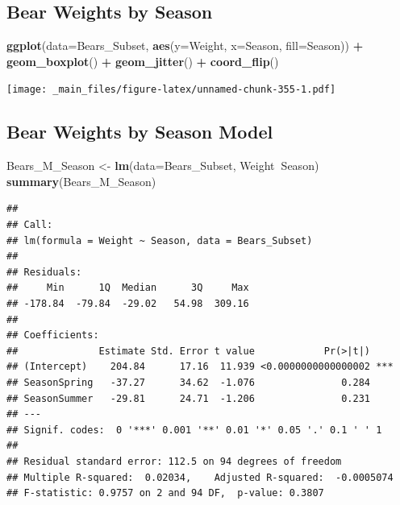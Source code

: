 \documentclass[]{book}
\newenvironment{Shaded}{\begin{snugshade}}{\end{snugshade}}
\newcommand{\KeywordTok}[1]{\textcolor[rgb]{0.13,0.29,0.53}{\textbf{#1}}}
\newcommand{\DataTypeTok}[1]{\textcolor[rgb]{0.13,0.29,0.53}{#1}}
\newcommand{\StringTok}[1]{\textcolor[rgb]{0.31,0.60,0.02}{#1}}
\newcommand{\OperatorTok}[1]{\textcolor[rgb]{0.81,0.36,0.00}{\textbf{#1}}}
\newcommand{\NormalTok}[1]{#1}
\begin{document}
\subsection{Bear Weights by Season}\label{bear-weights-by-season}

\begin{Shaded}
\begin{Highlighting}[]
\KeywordTok{ggplot}\NormalTok{(}\DataTypeTok{data=}\NormalTok{Bears_Subset, }\KeywordTok{aes}\NormalTok{(}\DataTypeTok{y=}\NormalTok{Weight, }\DataTypeTok{x=}\NormalTok{Season, }\DataTypeTok{fill=}\NormalTok{Season)) }\OperatorTok{+}\StringTok{ }
\StringTok{   }\KeywordTok{geom_boxplot}\NormalTok{() }\OperatorTok{+}\StringTok{ }\KeywordTok{geom_jitter}\NormalTok{() }\OperatorTok{+}\StringTok{ }\KeywordTok{coord_flip}\NormalTok{()}
\end{Highlighting}
\end{Shaded}

\texttt{[image: \_main\_files/figure-latex/unnamed-chunk-355-1.pdf]}

\subsection{Bear Weights by Season
Model}\label{bear-weights-by-season-model}

\begin{Shaded}
\begin{Highlighting}[]
\NormalTok{Bears_M_Season <-}\StringTok{ }\KeywordTok{lm}\NormalTok{(}\DataTypeTok{data=}\NormalTok{Bears_Subset, Weight}\OperatorTok{~}\NormalTok{Season)}
\KeywordTok{summary}\NormalTok{(Bears_M_Season)}
\end{Highlighting}
\end{Shaded}

\begin{verbatim}
## 
## Call:
## lm(formula = Weight ~ Season, data = Bears_Subset)
## 
## Residuals:
##     Min      1Q  Median      3Q     Max 
## -178.84  -79.84  -29.02   54.98  309.16 
## 
## Coefficients:
##              Estimate Std. Error t value            Pr(>|t|)    
## (Intercept)    204.84      17.16  11.939 <0.0000000000000002 ***
## SeasonSpring   -37.27      34.62  -1.076               0.284    
## SeasonSummer   -29.81      24.71  -1.206               0.231    
## ---
## Signif. codes:  0 '***' 0.001 '**' 0.01 '*' 0.05 '.' 0.1 ' ' 1
## 
## Residual standard error: 112.5 on 94 degrees of freedom
## Multiple R-squared:  0.02034,    Adjusted R-squared:  -0.0005074 
## F-statistic: 0.9757 on 2 and 94 DF,  p-value: 0.3807
\end{verbatim}
\end{document}
